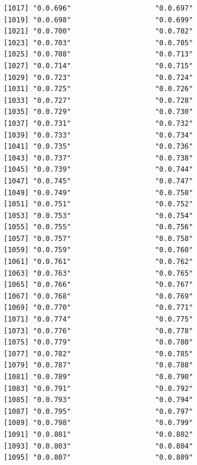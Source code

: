\documentclass[
  letterpaper,
  DIV=11,
  numbers=noendperiod]{scrreprt}
\begin{document}
\begin{verbatim}
[1017] "0.0.696"                    "0.0.697"                   
[1019] "0.0.698"                    "0.0.699"                   
[1021] "0.0.700"                    "0.0.702"                   
[1023] "0.0.703"                    "0.0.705"                   
[1025] "0.0.708"                    "0.0.713"                   
[1027] "0.0.714"                    "0.0.715"                   
[1029] "0.0.723"                    "0.0.724"                   
[1031] "0.0.725"                    "0.0.726"                   
[1033] "0.0.727"                    "0.0.728"                   
[1035] "0.0.729"                    "0.0.730"                   
[1037] "0.0.731"                    "0.0.732"                   
[1039] "0.0.733"                    "0.0.734"                   
[1041] "0.0.735"                    "0.0.736"                   
[1043] "0.0.737"                    "0.0.738"                   
[1045] "0.0.739"                    "0.0.744"                   
[1047] "0.0.745"                    "0.0.747"                   
[1049] "0.0.749"                    "0.0.750"                   
[1051] "0.0.751"                    "0.0.752"                   
[1053] "0.0.753"                    "0.0.754"                   
[1055] "0.0.755"                    "0.0.756"                   
[1057] "0.0.757"                    "0.0.758"                   
[1059] "0.0.759"                    "0.0.760"                   
[1061] "0.0.761"                    "0.0.762"                   
[1063] "0.0.763"                    "0.0.765"                   
[1065] "0.0.766"                    "0.0.767"                   
[1067] "0.0.768"                    "0.0.769"                   
[1069] "0.0.770"                    "0.0.771"                   
[1071] "0.0.774"                    "0.0.775"                   
[1073] "0.0.776"                    "0.0.778"                   
[1075] "0.0.779"                    "0.0.780"                   
[1077] "0.0.782"                    "0.0.785"                   
[1079] "0.0.787"                    "0.0.788"                   
[1081] "0.0.789"                    "0.0.790"                   
[1083] "0.0.791"                    "0.0.792"                   
[1085] "0.0.793"                    "0.0.794"                   
[1087] "0.0.795"                    "0.0.797"                   
[1089] "0.0.798"                    "0.0.799"                   
[1091] "0.0.801"                    "0.0.802"                   
[1093] "0.0.803"                    "0.0.804"                   
[1095] "0.0.807"                    "0.0.809"                   

\end{verbatim}
\end{document}
